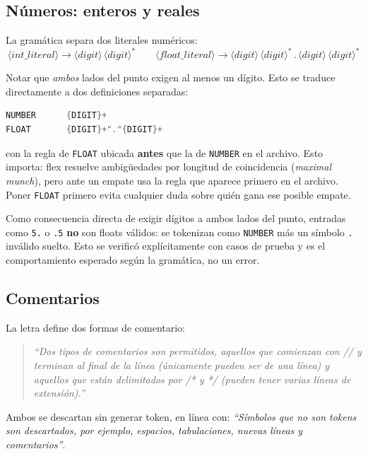 \documentclass[11pt,a4paper]{article}
\begin{document}
\subsection{N\'umeros: enteros y reales}

La gram\'atica separa dos literales num\'ericos:
\[
\langle int\_literal \rangle \rightarrow \langle digit \rangle\, \langle digit \rangle^{*}
\qquad
\langle float\_literal \rangle \rightarrow \langle digit \rangle\, \langle digit \rangle^{*}\, \text{.}\, \langle digit \rangle\, \langle digit \rangle^{*}
\]

Notar que \emph{ambos} lados del punto exigen al menos un d\'igito. Esto
se traduce directamente a dos definiciones separadas:

\begin{lstlisting}[language=C]
NUMBER      {DIGIT}+
FLOAT       {DIGIT}+"."{DIGIT}+
\end{lstlisting}

con la regla de \texttt{FLOAT} ubicada \textbf{antes} que la de
\texttt{NUMBER} en el archivo. Esto importa: flex resuelve ambig\"uedades
por longitud de coincidencia (\emph{maximal munch}), pero ante un
empate usa la regla que aparece primero en el archivo. Poner
\texttt{FLOAT} primero evita cualquier duda sobre qui\'en gana ese
posible empate.

Como consecuencia directa de exigir d\'igitos a ambos lados del punto,
entradas como \texttt{5.} o \texttt{.5} \textbf{no} son floats v\'alidos:
se tokenizan como \texttt{NUMBER} m\'as un s\'imbolo \texttt{.} inv\'alido
suelto. Esto se verific\'o expl\'icitamente con casos de prueba y es el
comportamiento esperado seg\'un la gram\'atica, no un error.

\subsection{Comentarios}

La letra define dos formas de comentario:

\begin{quote}
\emph{``Dos tipos de comentarios son permitidos, aquellos que comienzan
con // y terminan al final de la l\'inea (\'unicamente pueden ser de una
l\'inea) y aquellos que est\'an delimitados por /* y */ (pueden tener
varias l\'ineas de extensi\'on).''}
\end{quote}

Ambos se descartan sin generar token, en l\'inea con: \emph{``S\'imbolos
que no son tokens son descartados, por ejemplo, espacios, tabulaciones,
nuevas l\'ineas y comentarios''}.
\end{document}
